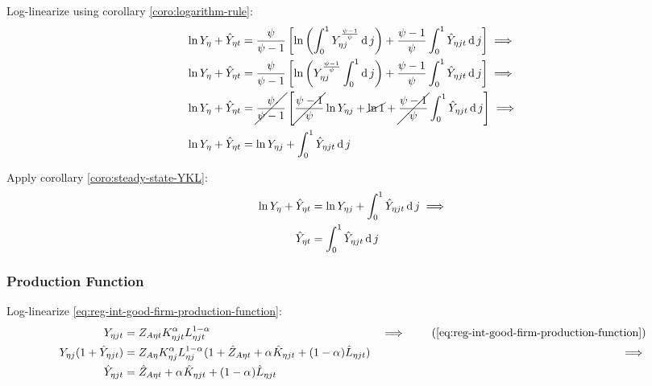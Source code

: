 \documentclass[../thesis.tex]{subfiles}
\begin{document}
Log-linearize using corollary \ref{coro:logarithm-rule}:
\begin{align}
	\ln{Y_{\eta}} + \hat{Y}_{\eta t} &= \frac{\psi}{\psi-1} \left[ \ln \left( \int_{0}^{1} Y_{\eta j}^{\frac{\psi-1}{\psi}} \operatorname{d} j \right) + \frac{\psi-1}{\psi} \int_{0}^{1} \hat{Y}_{\eta jt} \operatorname{d} j \right] \implies \nonumber
	\\
	\ln{Y_{\eta}} + \hat{Y}_{\eta t} &= \frac{\psi}{\psi-1} \left[ \ln \left( Y_{\eta j}^{\frac{\psi-1}{\psi}} \int_{0}^{1} \operatorname{d} j \right) + \frac{\psi-1}{\psi} \int_{0}^{1} \hat{Y}_{\eta jt} \operatorname{d} j \right] \implies \nonumber
	\\
	\ln{Y_{\eta}} + \hat{Y}_{\eta t} &= \cancel{\frac{\psi}{\psi-1}} \left[ \cancel{\frac{\psi-1}{\psi}} \ln{Y_{\eta j}} + \cancel{\ln1} + \cancel{\frac{\psi-1}{\psi}} \int_{0}^{1} \hat{Y}_{\eta jt} \operatorname{d} j \right] \implies \nonumber
	\\
	\ln{Y_{\eta}} + \hat{Y}_{\eta t} &= \ln{Y_{\eta j}} + \int_{0}^{1} \hat{Y}_{\eta jt} \operatorname{d} j \nonumber
\end{align}

Apply corollary \ref{coro:steady-state-YKL}:
\begin{align}
	\ln{Y_{\eta}} + \hat{Y}_{\eta t} &= \ln{Y_{\eta j}} + \int_{0}^{1} \hat{Y}_{\eta jt} \operatorname{d} j \implies \nonumber \\
	\hat{Y}_{\eta t} &= \int_{0}^{1} \hat{Y}_{\eta jt} \operatorname{d} j 
	\label{eq:reg-ll-final-goods-firm-bundle-rule}
\end{align}


\subsubsection*{Production Function}

Log-linearize \ref{eq:reg-int-good-firm-production-function}:
\begin{alignat}{2}
	Y_{\eta jt} &= Z_{A\eta t} K_{\eta jt}^{\alpha_{}} L_{\eta jt}^{1-{\alpha_{}}} &\implies \tag{\ref{eq:reg-int-good-firm-production-function}} \\
	Y_{\eta j} (1+ \hat{Y}_{\eta jt}) &= Z_{A\eta} K_{\eta j}^{\alpha_{}} L_{\eta j}^{1-{\alpha_{}}} (1+ \hat{Z}_{A\eta t} + {\alpha_{}} \hat{K}_{\eta jt} + (1-{\alpha_{}}) \hat{L}_{\eta jt}) &\implies \nonumber \\
	\hat{Y}_{\eta jt} &= \hat{Z}_{A\eta t} + {\alpha_{}} \hat{K}_{\eta jt} + (1-{\alpha_{}}) \hat{L}_{\eta jt} \label{eq:reg-ll-int-good-firm-production-function}
\end{alignat}
\end{document}
